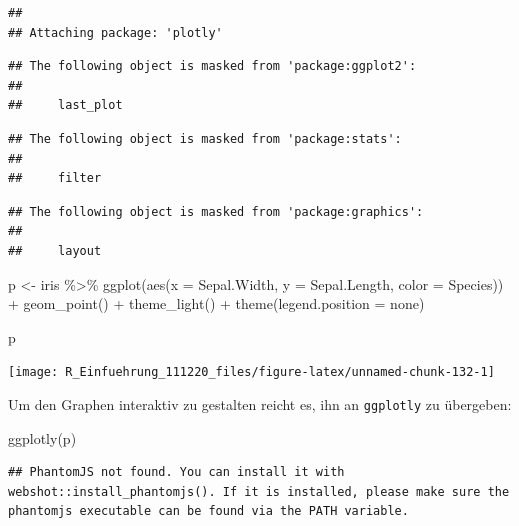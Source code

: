 \documentclass[
]{book}
\newenvironment{Shaded}{\begin{snugshade}}{\end{snugshade}}
\newcommand{\AttributeTok}[1]{\textcolor[rgb]{0.77,0.63,0.00}{#1}}
\newcommand{\FunctionTok}[1]{\textcolor[rgb]{0.00,0.00,0.00}{#1}}
\newcommand{\NormalTok}[1]{#1}
\newcommand{\OtherTok}[1]{\textcolor[rgb]{0.56,0.35,0.01}{#1}}
\newcommand{\SpecialCharTok}[1]{\textcolor[rgb]{0.00,0.00,0.00}{#1}}
\newcommand{\StringTok}[1]{\textcolor[rgb]{0.31,0.60,0.02}{#1}}
\begin{document}
\begin{verbatim}
## 
## Attaching package: 'plotly'
\end{verbatim}

\begin{verbatim}
## The following object is masked from 'package:ggplot2':
## 
##     last_plot
\end{verbatim}

\begin{verbatim}
## The following object is masked from 'package:stats':
## 
##     filter
\end{verbatim}

\begin{verbatim}
## The following object is masked from 'package:graphics':
## 
##     layout
\end{verbatim}

\begin{Shaded}
\begin{Highlighting}[]
\NormalTok{p }\OtherTok{\textless{}{-}}\NormalTok{ iris }\SpecialCharTok{\%\textgreater{}\%} 
  \FunctionTok{ggplot}\NormalTok{(}\FunctionTok{aes}\NormalTok{(}\AttributeTok{x =}\NormalTok{ Sepal.Width,}
             \AttributeTok{y =}\NormalTok{ Sepal.Length,}
             \AttributeTok{color =}\NormalTok{ Species)) }\SpecialCharTok{+}
  \FunctionTok{geom\_point}\NormalTok{() }\SpecialCharTok{+}
  \FunctionTok{theme\_light}\NormalTok{() }\SpecialCharTok{+}
  \FunctionTok{theme}\NormalTok{(}\AttributeTok{legend.position =} \StringTok{\textquotesingle{}none\textquotesingle{}}\NormalTok{)}

\NormalTok{p}
\end{Highlighting}
\end{Shaded}

\begin{center}\texttt{[image: R\_Einfuehrung\_111220\_files/figure-latex/unnamed-chunk-132-1]} \end{center}

Um den Graphen interaktiv zu gestalten reicht es, ihn an \texttt{ggplotly} zu übergeben:

\begin{Shaded}
\begin{Highlighting}[]
\FunctionTok{ggplotly}\NormalTok{(p)}
\end{Highlighting}
\end{Shaded}

\begin{verbatim}
## PhantomJS not found. You can install it with webshot::install_phantomjs(). If it is installed, please make sure the phantomjs executable can be found via the PATH variable.
\end{verbatim}
\end{document}
